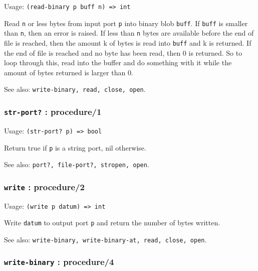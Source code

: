 \documentclass[
]{article}
\newcommand{\passthrough}[1]{#1}
\begin{document}
Usage: \passthrough{\lstinline!(read-binary p buff n) => int!}

Read \passthrough{\lstinline!n!} or less bytes from input port
\passthrough{\lstinline!p!} into binary blob
\passthrough{\lstinline!buff!}. If \passthrough{\lstinline!buff!} is
smaller than \passthrough{\lstinline!n!}, then an error is raised. If
less than \passthrough{\lstinline!n!} bytes are available before the end
of file is reached, then the amount k of bytes is read into
\passthrough{\lstinline!buff!} and k is returned. If the end of file is
reached and no byte has been read, then 0 is returned. So to loop
through this, read into the buffer and do something with it while the
amount of bytes returned is larger than 0.

See also: \passthrough{\lstinline!write-binary, read, close, open!}.

\hypertarget{str-port-procedure1}{%
\subsubsection{\texorpdfstring{\texttt{str-port?} :
procedure/1}{str-port? : procedure/1}}\label{str-port-procedure1}}

Usage: \passthrough{\lstinline!(str-port? p) => bool!}

Return true if \passthrough{\lstinline!p!} is a string port, nil
otherwise.

See also: \passthrough{\lstinline!port?, file-port?, stropen, open!}.

\hypertarget{write-procedure2}{%
\subsubsection{\texorpdfstring{\texttt{write} :
procedure/2}{write : procedure/2}}\label{write-procedure2}}

Usage: \passthrough{\lstinline!(write p datum) => int!}

Write \passthrough{\lstinline!datum!} to output port
\passthrough{\lstinline!p!} and return the number of bytes written.

See also:
\passthrough{\lstinline!write-binary, write-binary-at, read, close, open!}.

\hypertarget{write-binary-procedure4}{%
\subsubsection{\texorpdfstring{\texttt{write-binary} :
procedure/4}{write-binary : procedure/4}}\label{write-binary-procedure4}}
\end{document}
